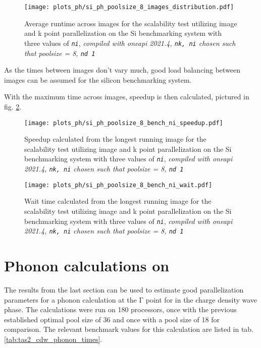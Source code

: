 \documentclass[main.tex]{subfiles}
\begin{document}
\begin{figure}[ht!]
    \centering
    \texttt{[image: plots\_ph/si\_ph\_poolsize\_8\_images\_distribution.pdf]}
    \caption{Average runtime across images for the scalability test utilizing image and k point parallelization on the Si benchmarking system with three values of \emph{\texttt{ni}}, \emph{\QE compiled with \gls{oneapi} 2021.4, \texttt{nk, ni} chosen such that poolsize = 8, \texttt{nd 1}}}
    \label{fig:scaling_ph_ni_poolsize_8_si_distribution}
\end{figure}
As the times between images don't vary much, good load balancing between images can be assumed for the silicon benchmarking system.

With the maximum time across images, speedup is then calculated, pictured in fig. \ref{fig:scaling_ph_ni_poolsize_8_si}.

\begin{figure}[ht!]
    \centering
    \texttt{[image: plots\_ph/si\_ph\_poolsize\_8\_bench\_ni\_speedup.pdf]}
    \caption{Speedup calculated from the longest running image for the scalability test utilizing image and k point parallelization on the Si benchmarking system with three values of \emph{\texttt{ni}}, \emph{\QE compiled with \gls{oneapi} 2021.4, \texttt{nk, ni} chosen such that poolsize = 8, \texttt{nd 1}}}
    \label{fig:scaling_ph_ni_poolsize_8_si}
\end{figure}


\begin{figure}[ht!]
    \centering
    \texttt{[image: plots\_ph/si\_ph\_poolsize\_8\_bench\_ni\_wait.pdf]}
    \caption{Wait time calculated from the longest running image for the scalability test utilizing image and k point parallelization on the Si benchmarking system with three values of \emph{\texttt{ni}}, \emph{\QE compiled with \gls{oneapi} 2021.4, \texttt{nk, ni} chosen such that poolsize = 8, \texttt{nd 1}}}
    \label{fig:scaling_ph_ni_poolsize_8_si_wait}
\end{figure}

\section{Phonon calculations on \TaS}

The results from the last section can be used to estimate good parallelization parameters for a phonon calculation at the \(\mathrm{\Gamma}\) point for \TaS in the charge density wave phase.
The calculations were run on 180 processors, once with the previous established optimal pool size of 36 and once with a pool size of 18 for comparison.
The relevant benchmark values for this calculation are listed in tab. \ref{tab:tas2_cdw_phonon_times}.
\end{document}
